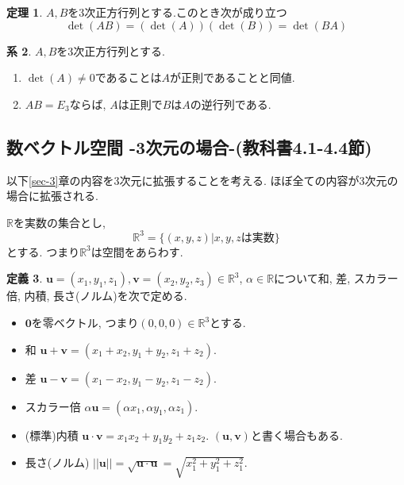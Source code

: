 \documentclass[dvipdfmx,a4paper,11pt]{article}
\newcommand{\R}{\mathbb{R}}
\theoremstyle{definition}
\newtheorem{thm}{定理}
\newtheorem{cor}[thm]{系}
\newtheorem{dfn}[thm]{定義}
\begin{document}
\begin{tcolorbox}[
    colback = white,
    colframe = green!35!black,
    fonttitle = \bfseries,
    breakable = true]
    \begin{thm}
   \label{determinant}
$A,B$を3次正方行列とする.このとき次が成り立つ
$$\det(AB)=(\det(A))(\det(B)) = \det(BA)$$
  \end{thm}
 \end{tcolorbox}
 


\begin{tcolorbox}[
    colback = white,
    colframe = green!35!black,
    fonttitle = \bfseries,
    breakable = true]
    \begin{cor}
   \label{determinant}
$A,B$を3次正方行列とする.
\begin{enumerate}
	\setlength{\parskip}{0cm}
  	\setlength{\itemsep}{0pt} 
\item $\det(A) \neq 0$であることは$A$が正則であることと同値.
\item $AB=E_3$ならば, $A$は正則で$B$は$A$の逆行列である. 
\end{enumerate}
  \end{cor}
 \end{tcolorbox}


\subsection{数ベクトル空間 -3次元の場合-(教科書4.1-4.4節)}
以下\ref{sec-3}章の内容を3次元に拡張することを考える. 
ほぼ全ての内容が3次元の場合に拡張される. 

$\R$を実数の集合とし, 
$$
\R^3  = \{ (x, y,z) | \text{$x,y,z$は実数}\} 
$$
とする. 
つまり$\R^3$は空間をあらわす.


\begin{tcolorbox}[
    colback = white,
    colframe = green!35!black,
    fonttitle = \bfseries,
    breakable = true]
    \begin{dfn}
$\bm{u}=(x_1, y_1, z_1), \bm{v}=(x_2, y_2, z_3)\in \R^3$, $\alpha \in \R$について和, 差, スカラー倍, 内積, 長さ(ノルム)を次で定める.
\begin{itemize}
	\setlength{\parskip}{0cm}
  	\setlength{\itemsep}{0pt} 
\item $\bm{0}$を零ベクトル, つまり$(0,0,0) \in \R^3$とする.
\item 和 $\bm{u} + \bm{v} = (x_1 + x_2, y_1+ y_2, z_1 + z_2)$.
\item 差 $\bm{u} - \bm{v} = (x_1 - x_2, y_1 - y_2, z_1 - z_2)$.
\item スカラー倍 $\alpha \bm{u} = (\alpha x_1, \alpha y_1, \alpha z_1)$.
\item (標準)内積 $\bm{u} \cdot\bm{v} = x_1 x_2 +  y_1 y_2+ z_1z_2 $. $(\bm{u}, \bm{v})$と書く場合もある. 
\item 長さ(ノルム) $||\bm{u}||= \sqrt{\bm{u} \cdot\bm{u}} = \sqrt{x_{1}^2 +  y_{1}^{2} +  z_{1}^{2} }$.
\end{itemize}
    \end{dfn}
 \end{tcolorbox}
\end{document}
